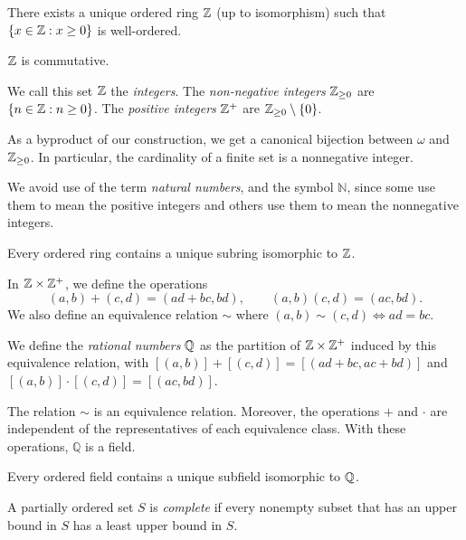   \begin{thm}
    There exists a unique ordered ring $\mathbb{Z}$ (up to isomorphism) such that
    $\{x\in\mathbb{Z}:x\ge 0\}$ is well-ordered.

    $\mathbb{Z}$ is commutative.
  \end{thm}
  \begin{defn}
    We call this set $\mathbb{Z}$ the \emph{integers}. The \emph{non-negative
    integers} $\mathbb{Z}_{\ge 0}$ are $\{n\in\mathbb{Z}: n\ge 0\}$. The \emph{positive
    integers} $\mathbb{Z}^+$ are $\mathbb{Z}_{\ge 0}\setminus \{0\}$.
  \end{defn}
  \begin{rem}
    As a byproduct of our construction, we get a canonical bijection between
    $\omega$ and $\mathbb{Z}_{\ge 0}$.
    In particular, the cardinality of a finite set is a nonnegative integer.
  \end{rem}
  \begin{rem}
    We avoid use of the term \emph{natural numbers}, and the symbol $\mathbb N$,
    since
    some use them to mean the positive integers and others use them to mean the
    nonnegative integers.
  \end{rem}
  \begin{prop}
    Every ordered ring contains a unique subring isomorphic to $\mathbb{Z}$.
  \end{prop}
  \begin{defn}
    In $\mathbb{Z}\times\mathbb{Z}^+$, we define the operations
    \[(a,b)+(c,d)=(ad+bc,bd),\qquad (a,b)(c,d)=(ac,bd).\]
    We also define an equivalence relation $\sim$ where
    $(a,b)\sim (c,d)\iff ad=bc$.

    We define the \emph{rational numbers} $\mathbb{Q}$ as the partition
    of $\mathbb{Z}\times\mathbb{Z}^+$ induced by this equivalence relation, with
    $[(a,b)]+[(c,d)]=[(ad+bc,ac+bd)]$ and $[(a,b)]\cdot [(c,d)]=[(ac,bd)]$.
  \end{defn}
  \begin{prop}
    The relation $\sim$ is an equivalence relation. Moreover, the operations $+$
    and $\cdot$ are independent of the representatives of each equivalence
    class. With these operations, $\mathbb Q$ is a field.
  \end{prop}
  \begin{prop}
    Every ordered field contains a unique subfield isomorphic to $\mathbb{Q}$.
  \end{prop}
  \begin{defn}
    A partially ordered set $S$ is \emph{complete} if every nonempty subset that has
    an upper bound in $S$ has a least upper bound in $S$.
  \end{defn}

